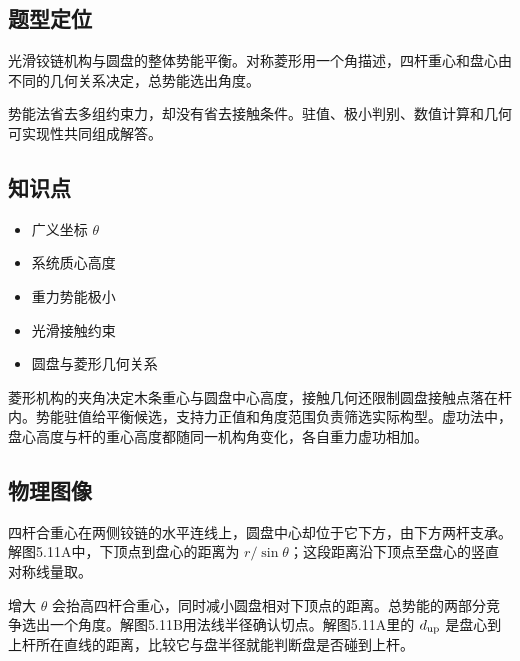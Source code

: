 \documentclass[UTF8,fontset=fandol,a4paper,11pt]{ctexart}
\providecommand{\tightlist}{\setlength{\itemsep}{0pt}\setlength{\parskip}{0pt}}
\begin{document}


\subsection*{题型定位}

光滑铰链机构与圆盘的整体势能平衡。对称菱形用一个角描述，四杆重心和盘心由不同的几何关系决定，总势能选出角度。

势能法省去多组约束力，却没有省去接触条件。驻值、极小判别、数值计算和几何可实现性共同组成解答。



\subsection*{知识点}

\begin{itemize}
\tightlist
\item
  广义坐标 \(\theta\)
\item
  系统质心高度
\item
  重力势能极小
\item
  光滑接触约束
\item
  圆盘与菱形几何关系
\end{itemize}

菱形机构的夹角决定木条重心与圆盘中心高度，接触几何还限制圆盘接触点落在杆内。势能驻值给平衡候选，支持力正值和角度范围负责筛选实际构型。虚功法中，盘心高度与杆的重心高度都随同一机构角变化，各自重力虚功相加。




\subsection*{物理图像}

四杆合重心在两侧铰链的水平连线上，圆盘中心却位于它下方，由下方两杆支承。解图5.11A中，下顶点到盘心的距离为 $r/\sin\theta$；这段距离沿下顶点至盘心的竖直对称线量取。

增大 $\theta$ 会抬高四杆合重心，同时减小圆盘相对下顶点的距离。总势能的两部分竞争选出一个角度。解图5.11B用法线半径确认切点。解图5.11A里的 $d_{\rm up}$ 是盘心到上杆所在直线的距离，比较它与盘半径就能判断盘是否碰到上杆。

\end{document}
